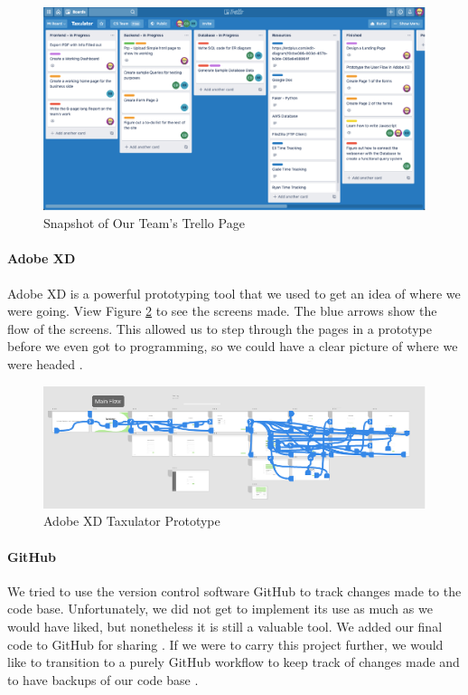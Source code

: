 \documentclass[sigconf]{acmart}
\begin{document}
\begin{figure}[H]
  \label{Trello}
  \centering
  \includegraphics[width=\linewidth]{Images/TrelloBoard.png}
  \caption{Snapshot of Our Team’s Trello Page}
\end{figure}

\paragraph{Adobe XD}
Adobe XD is a powerful prototyping tool that we used to get an idea of where we were going. View Figure \ref{Prototype} to see the screens made. The blue arrows show the flow of the screens. This allowed us to step through the pages in a prototype before we even got to programming, so we could have a clear picture of where we were headed \cite{AdobeXD}.

\begin{figure}[H]
  \includegraphics[width=\linewidth]{Images/Prototype.png}
  \caption{Adobe XD Taxulator Prototype}
  \centering
  \label{Prototype}
\end{figure}

\paragraph{GitHub}
We tried to use the version control software GitHub to track changes made to the code base. Unfortunately, we did not get to implement its use as much as we would have liked, but nonetheless it is still a valuable tool. We added our final code to GitHub for sharing \cite{TaxulatorCode}. If we were to carry this project further, we would like to transition to a purely GitHub workflow to keep track of changes made and to have backups of our code base \cite{GitHub}.
\end{document}
